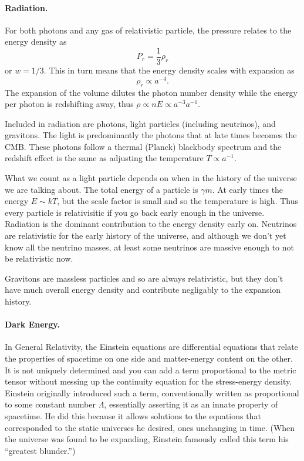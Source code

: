 \paragraph{Radiation.}  For both photons and any gas of relativistic particle, the pressure relates to the energy density as
\begin{equation}
  P_r = \frac{1}{3} \rho_r
\end{equation}
or $w=1/3$.
This in turn means that the energy density scales with expansion as
\begin{equation}
  \rho_r \propto a^{-4}.
\end{equation}
The expansion of the volume dilutes the photon number density while the energy per photon is redshifting away, thus $\rho \propto n E \propto a^{-3}a^{-1}$.

Included in radiation are photons, light particles (including neutrinos), and gravitons.  The light is predominantly the photons that at late times becomes the CMB.  These photons follow a thermal (Planck) blackbody spectrum and the redshift effect is the same as adjusting the temperature $T \propto a^{-1}$.

What we count as a light particle depends on when in the history of the universe we are talking about.  The total energy of a particle is $\gamma m$.  At early times the energy $E \sim kT$, but the scale factor is small and so the temperature is high.  Thus every particle is relativisitic if you go back early enough in the universe.  Radiation is the dominant contribution to the energy density early on.  Neutrinos are relativistic for the early history of the universe, and although we don't yet know all the neutrino masses, at least some neutrinos are massive enough to not be relativistic now.

Gravitons are massless particles and so are always relativistic, but they don't have much overall energy density and contribute negligably to the expansion history.

\paragraph{Dark Energy.}  In General Relativity, the Einstein equations are differential equations that relate the properties of spacetime on one side and matter-energy content on the other.  It is not uniquely determined and you can add a term proportional to the metric tensor without messing up the continuity equation for the stress-energy density.  Einstein originally introduced such a term, conventionally written as proportional to some constant number $\Lambda$, essentially asserting it as an innate property of spacetime.  He did this because it allows solutions to the equations that corresponded to the static universes he desired, ones unchanging in time.  (When the universe was found to be expanding, Einstein famously called this term his ``greatest blunder.'')

